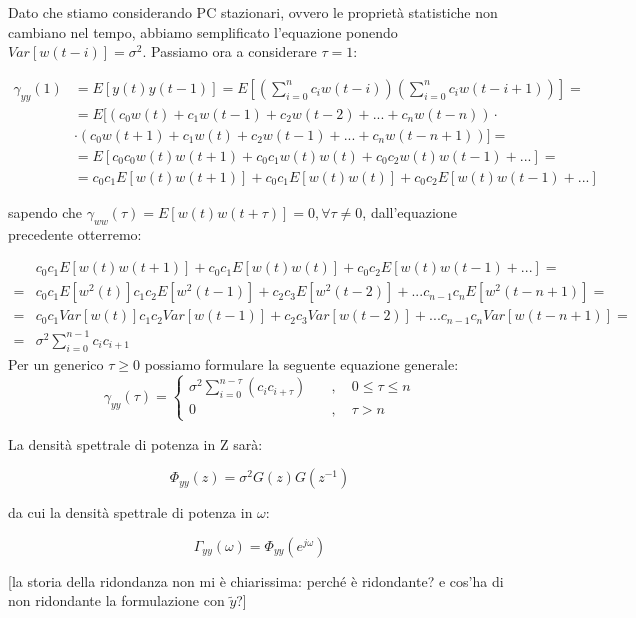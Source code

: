 Dato che stiamo considerando PC stazionari, ovvero le proprietà statistiche non cambiano nel tempo, abbiamo semplificato l'equazione ponendo $Var[w(t-i)]=\sigma^2$. Passiamo ora a considerare $\tau=1$:
 
  \[ 
    \begin{split}
  \gamma_{yy}(1)&=E[y(t)y(t-1)]=E\left[ \left( \sum_{i=0}^{n}{c_iw(t-i)}\right)\left( \sum_{i=0}^{n}{c_iw(t-i+1)}\right)    \right]=\\
  &=E[(c_0w(t)+c_1w(t-1)+c_2w(t-2)+...+c_nw(t-n))\cdot\\
  &\cdot(c_0w(t+1)+c_1w(t)+c_2w(t-1)+...+c_nw(t-n+1))]=\\
  &=E[c_0c_0w(t)w(t+1)+c_0c_1w(t)w(t)+c_0c_2w(t)w(t-1)+...]=\\
  &=c_0c_1E[w(t)w(t+1)]+c_0c_1E[w(t)w(t)]+c_0c_2E[w(t)w(t-1)+...]
    \end{split}
  \]
  
sapendo che $\gamma_{ww}(\tau)=E[w(t)w(t+\tau)]=0, \forall \tau\neq0$, dall'equazione precedente otterremo:
  
  \[ 
    \begin{split}
      &c_0c_1E[w(t)w(t+1)]+c_0c_1E[w(t)w(t)]+c_0c_2E[w(t)w(t-1)+...]=\\
      =&c_0c_1E[w^2(t)]c_1c_2E[w^2(t-1)]+c_2c_3E[w^2(t-2)]+...c_{n-1}c_nE[w^2(t-n+1)]=\\
      =&c_0c_1Var[w(t)]c_1c_2Var[w(t-1)]+c_2c_3Var[w(t-2)]+...c_{n-1}c_nVar[w(t-n+1)]=\\
      =&\sigma^2 \sum_{i=0}^{n-1}{c_ic_{i+1}}
    \end{split}
   \]
Per un generico $\tau \geq 0$ possiamo formulare la seguente equazione generale:
  \[ 
      \gamma_{yy}(\tau)=
      \left\lbrace
      \begin{split}
         \sigma^2 \sum_{i=0}^{n-\tau}{(c_ic_{i+\tau})}\quad&,\quad 0\leq\tau\leq n \\
         0 \quad&,\quad \tau>n
      \end{split}\right.
   \]

\noindent La densità spettrale di potenza in Z sarà:

  \[ \Phi_{yy}(z)=\sigma^2G(z)G(z^{-1}) \]

\noindent da cui la densità spettrale di potenza in $\omega$:

  \[ \Gamma_{yy}(\omega)=\Phi_{yy}(e^{j\omega})\]

[la storia della ridondanza non mi è chiarissima: perché è ridondante? e cos'ha di non ridondante la formulazione con $\tilde{y}$?]


